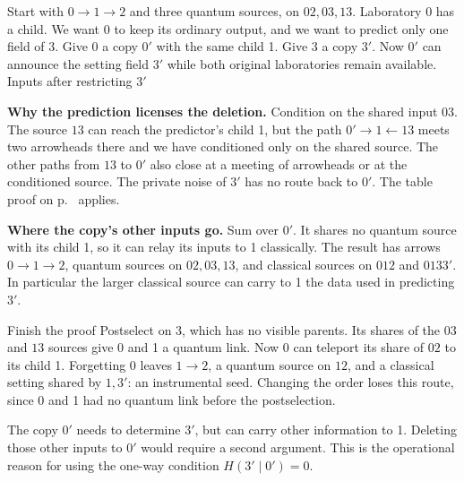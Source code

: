 \label{sec:twocopies}
Start with \(0\to1\to2\) and three quantum sources, on \(02,03,13\). Laboratory 0 has a child. We want 0 to keep its ordinary output, and we want to predict only one field of 3. Give 0 a copy \(0'\) with the same child 1. Give 3 a copy \(3'\). Now \(0'\) can announce the setting field \(3'\) while both original laboratories remain available.
{Inputs after restricting \(3'\)}{
}

\textbf{Why the prediction licenses the deletion.} Condition on the shared input \(03\). The source \(13\) can reach the predictor's child 1, but the path \(0'\to1\leftarrow13\) meets two arrowheads there and we have conditioned only on the shared source. The other paths from \(13\) to \(0'\) also close at a meeting of arrowheads or at the conditioned source. The private noise of \(3'\) has no route back to \(0'\). The table proof on p.~\pageref{sec:separate} applies.

\textbf{Where the copy's other inputs go.} Sum over \(0'\). It shares no quantum source with its child 1, so it can relay its inputs to 1 classically. The result has arrows \(0\to1\to2\), quantum sources on \(02,03,13\), and classical sources on \(012\) and \(0133'\). In particular the larger classical source can carry to 1 the data used in predicting \(3'\).
\begin{validbox}{Finish the proof}
Postselect on 3, which has no visible parents. Its shares of the \(03\) and \(13\) sources give 0 and 1 a quantum link. Now 0 can teleport its share of \(02\) to its child 1. Forgetting 0 leaves \(1\to2\), a quantum source on \(12\), and a classical setting shared by \(1,3'\): an instrumental seed. Changing the order loses this route, since 0 and 1 had no quantum link before the postselection.
\end{validbox}
The copy \(0'\) needs to determine \(3'\), but can carry other information to 1. Deleting those other inputs to \(0'\) would require a second argument. This is the operational reason for using the one-way condition \(H(3'\mid 0')=0\).
